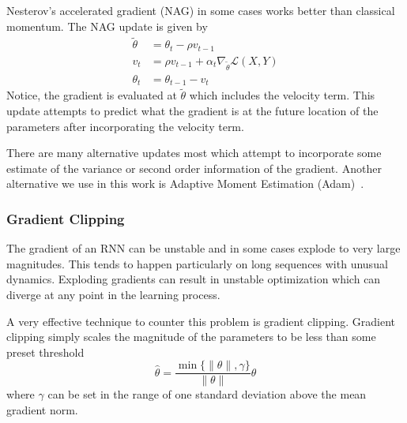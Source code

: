 Nesterov's accelerated gradient (NAG) in some cases works better than classical
momentum. The NAG update is given by 
\begin{align*}
    \tilde{\theta} &= \theta_t - \rho v_{t-1} \\
    v_t &= \rho v_{t-1} + \alpha_t \nabla_{\tilde{\theta}} \mathcal{L}(X, Y) \\
    \theta_t &= \theta_{t-1} - v_t 
\end{align*}
Notice, the gradient is evaluated at $\tilde{\theta}$ which includes the
velocity term. This update attempts to predict what the gradient is at the
future location of the parameters after incorporating the velocity term.

There are many alternative updates most which attempt to incorporate some
estimate of the variance or second order information of the gradient. Another
alternative we use in this work is Adaptive Moment Estimation
(Adam)~\cite{kingma2014adam}.

\subsubsection{Gradient Clipping}

The gradient of an RNN can be unstable and in some cases explode to very large
magnitudes. This tends to happen particularly on long sequences with unusual
dynamics. Exploding gradients can result in unstable optimization which can
diverge at any point in the learning process.

A very effective technique to counter this problem is gradient clipping.
Gradient clipping simply scales the magnitude of the parameters to be less than
some preset threshold
\[
\hat{\theta} = \frac{\min\{\|\theta\|, \gamma\}}{\|\theta\|} \theta
\]
where $\gamma$ can be set in the range of one standard deviation above the mean
gradient norm.
